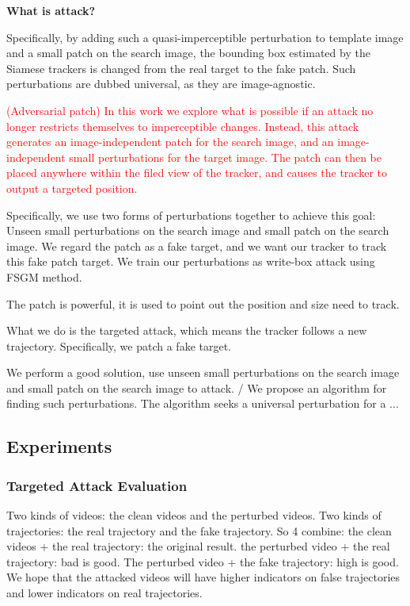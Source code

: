 \documentclass{article}
\begin{document}
\textbf{What is attack?}

Specifically, by adding such a quasi-imperceptible perturbation to template image and a small patch on the search image, the bounding box estimated by the Siamese trackers is changed from the real target to the fake patch. Such perturbations are dubbed universal, as they are image-agnostic.

\textcolor{red}{(Adversarial patch) In this work we explore what is possible if an attack no longer restricts themselves to imperceptible changes. Instead, this attack generates an image-independent patch for the search image, and an image-independent small perturbations for the target image. The patch can then be placed anywhere within the filed view of the tracker, and causes the tracker to output a targeted position.}

Specifically, we use two forms of perturbations together to achieve this goal: Unseen small perturbations on the search image and small patch on the search image. We regard the patch as a fake target, and we want our tracker to track this fake patch target. We train our perturbations as write-box attack using FSGM \cite{FGSM} method.

The patch is powerful, it is used to point out the position and size need to track.

What we do is the targeted attack, which means the tracker follows a new trajectory. Specifically, we patch a fake target.

We perform a good solution, use unseen small perturbations on the search image and small patch on the search image to attack. / We propose an algorithm for finding such perturbations. The algorithm seeks a universal perturbation for a ...

\subsection{Experiments}

\subsubsection{Targeted Attack Evaluation}

Two kinds of videos: the clean videos and the perturbed videos.
Two kinds of trajectories: the real trajectory and the fake trajectory.
So 4 combine: the clean videos + the real trajectory: the original result.
the perturbed video + the real trajectory: bad is good.
The perturbed video + the fake trajectory: high is good.
We hope that the attacked videos will have higher indicators on false trajectories and lower indicators on real trajectories.
\end{document}
